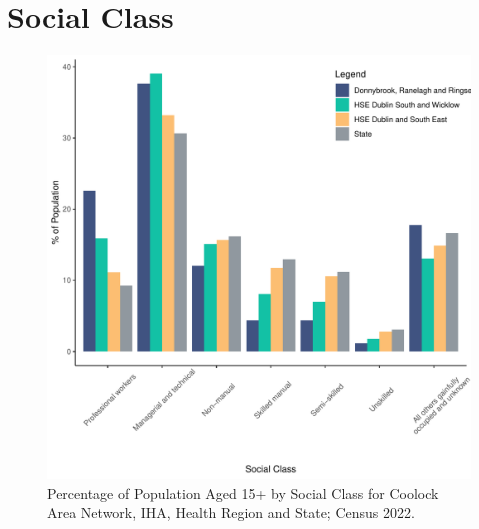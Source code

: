 \documentclass{article}
\begin{document}
\section{Social Class}\label{sect:SC}
\begin{figure}[H]
	\centering
	\includegraphics[width = 140mm]{../figures/SocialClassED.pdf}
	\caption{Percentage of Population Aged 15+ by Social Class for Coolock Area Network, IHA, Health Region and State; Census 2022.}
	\label{fig:vbnv}
	\end{figure}
\end{document}
